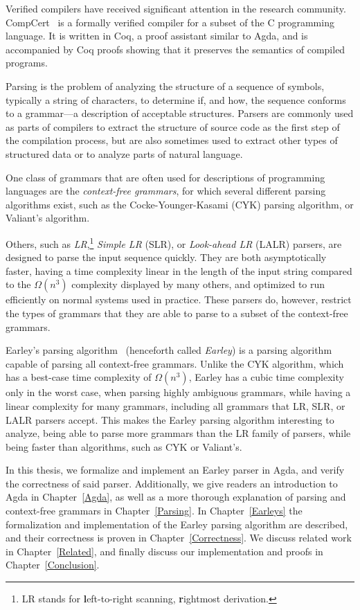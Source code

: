 	Verified compilers have received significant attention in the research
	community. CompCert~\cite{Leroy} is a formally verified compiler for a
	subset of the C programming language. It is written in Coq, a proof
	assistant similar to Agda, and is accompanied by Coq proofs showing that it
	preserves the semantics of compiled programs.


	Parsing is the problem of analyzing the structure of a sequence of
	symbols, typically a string of characters, to determine if, and how, the
	sequence conforms to a grammar---a description of acceptable structures.
	Parsers are commonly used as parts of compilers to extract the structure of
	source code as the first step of the compilation process, but are also
	sometimes used to extract other types of structured data or to analyze
	parts of natural language.

	One class of grammars that are often used for descriptions of programming
	languages are the \emph{context-free grammars}, for which several different
	parsing algorithms exist, such as the Cocke-Younger-Kasami (CYK) parsing
	algorithm, or Valiant's algorithm.~\cite{kasami66,valiant75}

	Others, such as \emph{LR},\footnote{LR stands for \textbf{l}eft-to-right
	scanning, \textbf{r}ightmost derivation.} \emph{Simple LR} (SLR), or
	\emph{Look-ahead LR} (LALR) parsers, are designed to parse the input
	sequence quickly. They are both asymptotically faster, having a time
	complexity linear in the length of the input string compared to the
	$\Omega(n^3)$ complexity displayed by many others, and optimized to run
	efficiently on normal systems used in practice. These parsers do, however,
	restrict the types of grammars that they are able to parse to a subset of
	the context-free grammars.

	Earley's parsing algorithm~\cite{Earley} (henceforth called \emph{Earley})
	is a parsing algorithm capable of parsing all context-free grammars. Unlike
	the CYK algorithm, which has a best-case time complexity of $\Omega(n^3)$,
	Earley has a cubic time complexity only in the worst case, when parsing
	highly ambiguous grammars, while having a linear complexity for many
	grammars, including all grammars that LR, SLR, or LALR parsers accept.
	This makes the Earley parsing algorithm interesting to analyze, being able
	to parse more grammars than the LR family of parsers, while being faster
	than algorithms, such as CYK or Valiant's.

	In this thesis, we formalize and implement an Earley parser in Agda, and
	verify the correctness of said parser. Additionally, we give readers an
	introduction to Agda in Chapter~\ref{Agda}, as well as a more thorough
	explanation of parsing and context-free grammars in Chapter~\ref{Parsing}.
	In Chapter~\ref{Earleys} the formalization and implementation of the Earley
	parsing algorithm are described, and their correctness is proven in
	Chapter~\ref{Correctness}. We discuss related work in
	Chapter~\ref{Related}, and finally discuss our implementation and proofs in
	Chapter~\ref{Conclusion}.

